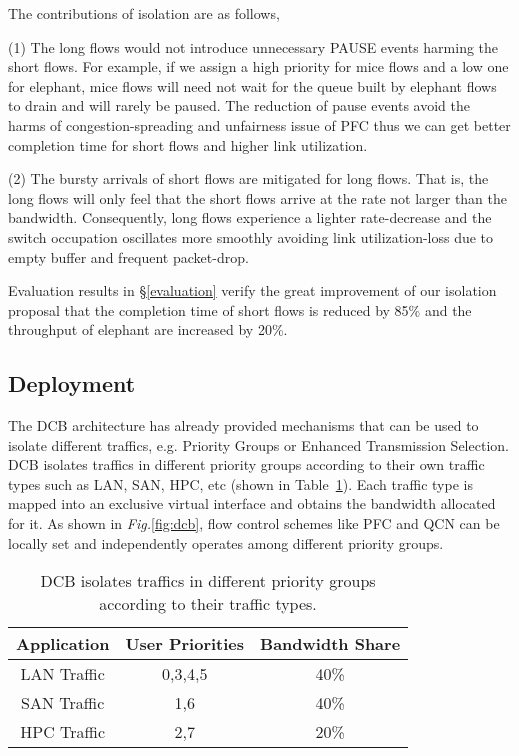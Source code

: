 \documentclass[]{sig-alternate-10pt}
\begin{document}
The contributions of isolation are as follows,

(1) The long flows would not introduce unnecessary PAUSE events harming the short flows.
	For example, if we assign a high priority for mice flows and a low one for elephant, mice flows will need not wait for the queue built by elephant flows to drain and will rarely be paused. 
The reduction of pause events avoid the harms of congestion-spreading and unfairness issue of PFC thus we can get better completion time for short flows and higher link utilization.

(2) The bursty arrivals of short flows are mitigated for long flows. That is, the long flows will only feel that the short flows arrive at the rate not larger than  the bandwidth.
Consequently, long flows experience a lighter rate-decrease and the switch occupation   oscillates more smoothly avoiding link utilization-loss due to empty buffer and frequent packet-drop.



Evaluation results in \S\ref{evaluation} verify the great improvement of our isolation proposal that the completion time of short flows is reduced by 85\% and the throughput of elephant are increased by 20\%.



\subsection{Deployment}
The DCB architecture has already provided mechanisms that can be used to isolate different traffics, e.g. Priority Groups or Enhanced Transmission Selection.
DCB isolates traffics in different priority groups according to their own traffic types such as LAN, SAN, HPC, etc (shown in Table~\ref{tab:class}).
Each traffic type is mapped into an exclusive virtual interface and obtains the bandwidth allocated for it.
As shown in \emph{Fig.}\ref{fig:dcb}, flow control schemes like PFC and QCN can be locally set and independently operates among different priority groups.
\begin{table}[h]
	\centering
	\begin{tabular}{|c|c|c|}
		\hline
		Application & User Priorities & Bandwidth Share  \\
		\hline
		LAN  Traffic & 0,3,4,5 & 40\%  \\
		\hline
		SAN  Traffic & 1,6 & 40\%  \\
		\hline
		HPC  Traffic & 2,7 & 20\% \\
		\hline
	\end{tabular}
	\caption{DCB isolates traffics in different priority groups according to their traffic types.}
	\label{tab:class}
\end{table}
\end{document}
